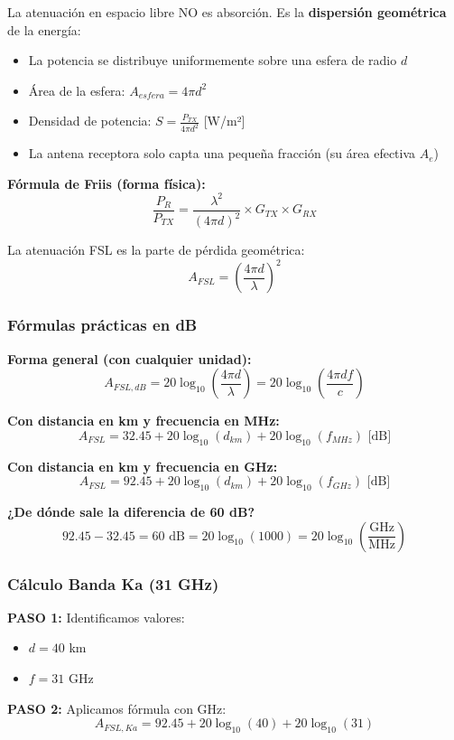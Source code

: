 \documentclass[a4paper,10pt]{article}
\begin{document}
La atenuación en espacio libre NO es absorción. Es la \textbf{dispersión geométrica} de la energía:
\begin{itemize}
    \item La potencia se distribuye uniformemente sobre una esfera de radio $d$
    \item Área de la esfera: $A_{esfera} = 4\pi d^2$
    \item Densidad de potencia: $S = \frac{P_{TX}}{4\pi d^2}$ [W/m²]
    \item La antena receptora solo capta una pequeña fracción (su área efectiva $A_e$)
\end{itemize}

\textbf{Fórmula de Friis (forma física):}
$$\frac{P_R}{P_{TX}} = \frac{\lambda^2}{(4\pi d)^2} \times G_{TX} \times G_{RX}$$

La atenuación FSL es la parte de pérdida geométrica:
$$A_{FSL} = \left(\frac{4\pi d}{\lambda}\right)^2$$

\subsubsection{Fórmulas prácticas en dB}

\textbf{Forma general (con cualquier unidad):}
$$A_{FSL,dB} = 20\log_{10}\left(\frac{4\pi d}{\lambda}\right) = 20\log_{10}\left(\frac{4\pi d f}{c}\right)$$

\textbf{Con distancia en km y frecuencia en MHz:}
$$\boxed{A_{FSL} = 32.45 + 20\log_{10}(d_{km}) + 20\log_{10}(f_{MHz}) \text{ [dB]}}$$

\textbf{Con distancia en km y frecuencia en GHz:}
$$\boxed{A_{FSL} = 92.45 + 20\log_{10}(d_{km}) + 20\log_{10}(f_{GHz}) \text{ [dB]}}$$

\textbf{¿De dónde sale la diferencia de 60 dB?}
$$92.45 - 32.45 = 60 \text{ dB} = 20\log_{10}(1000) = 20\log_{10}\left(\frac{\text{GHz}}{\text{MHz}}\right)$$

\subsubsection{Cálculo Banda Ka (31 GHz)}

\textbf{PASO 1:} Identificamos valores:
\begin{itemize}
    \item $d = 40$ km
    \item $f = 31$ GHz
\end{itemize}

\textbf{PASO 2:} Aplicamos fórmula con GHz:
$$A_{FSL,Ka} = 92.45 + 20\log_{10}(40) + 20\log_{10}(31)$$
\end{document}
